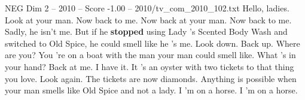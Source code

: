 \begin{textsample}{NEG Dim 2 – 2010 – Score -1.00 – 2010/tv\_com\_2010\_102.txt}  \label{ex:f2_neg_058}
Hello, ladies.
Look at your man.
Now back to me.
Now back at your man.
Now back to me.
Sadly, he isn't me.
But if he \textbf{stopped} using Lady 's Scented Body Wash and switched to Old Spice, he could smell like he 's me.
Look down.
Back up.
Where are you?
You 're on a boat with the man your man could smell like.
What 's in your hand?
Back at me.
I have it.
It 's an oyster with two tickets to that thing you love.
Look again.
The tickets are now diamonds.
Anything is possible when your man smells like Old Spice and not a lady.
I 'm on a horse.
I 'm on a horse.

\end{textsample}
